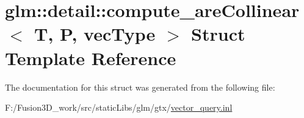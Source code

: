 \hypertarget{structglm_1_1detail_1_1compute__are_collinear}{}\section{glm\+:\+:detail\+:\+:compute\+\_\+are\+Collinear$<$ T, P, vec\+Type $>$ Struct Template Reference}
\label{structglm_1_1detail_1_1compute__are_collinear}


The documentation for this struct was generated from the following file\+:\begin{DoxyCompactItemize}
\item 
F\+:/\+Fusion3\+D\+\_\+work/src/static\+Libs/glm/gtx/\hyperlink{vector__query_8inl}{vector\+\_\+query.\+inl}\end{DoxyCompactItemize}
